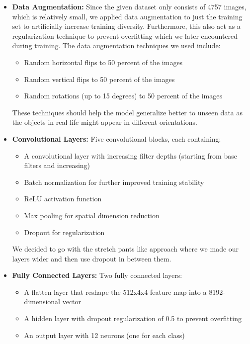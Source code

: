 \documentclass[10pt]{article}
\begin{document}
\begin{itemize}
    \item \textbf{Data Augmentation:} Since the given dataset only consists of 4757 images, which is relatively small, we applied data augmentation to just the
    training set to artificially increase training diversity. Furthermore, this also act as a regularization technique to prevent overfitting which we later
    encountered during training. The data augmentation techniques we used include:
    \begin{itemize}
        \item Random horizontal flips to 50 percent of the images
        \item Random vertical flips to 50 percent of the images
        \item Random rotations (up to 15 degrees) to 50 percent of the images
    \end{itemize}
    These techniques should help the model generalize better to unseen data as the objects in real life might appear in different orientations.

    \item \textbf{Convolutional Layers:} Five convolutional blocks, each containing:
    \begin{itemize}
        \item A convolutional layer with increasing filter depths (starting from base filters and increasing)
        \item Batch normalization for further improved training stability
        \item ReLU activation function
        \item Max pooling for spatial dimension reduction
        \item Dropout for regularization
    \end{itemize}
    We decided to go with the stretch pants like approach where we made our layers wider and then use dropout in between them.

    \item \textbf{Fully Connected Layers:} Two fully connected layers:
    \begin{itemize}
        \item A flatten layer that reshape the 512x4x4 feature map into a 8192-dimensional vector
        \item A hidden layer with dropout regularization of 0.5 to prevent overfitting
        \item An output layer with 12 neurons (one for each class)
    \end{itemize}


\end{itemize}
\end{document}
